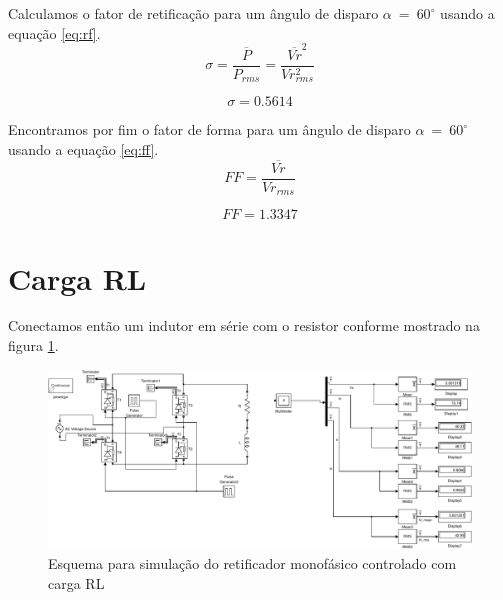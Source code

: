 \documentclass{report}
\begin{document}
Calculamos o fator de retificação para um ângulo de disparo $\alpha\ =\ 60^\circ$ usando a equação \ref{eq:rf}.
\begin{equation}
	\sigma = \frac{\overline{P}}{P_{rms}} = \frac{\overline{Vr}^2}{Vr_{rms}^2}
	\label{eq:rf}
\end{equation}

\begin{equation}
	\sigma = 0.5614
\end{equation}

Encontramos por fim o fator de forma para um ângulo de disparo $\alpha\ =\ 60^\circ$ usando a equação \ref{eq:ff}.
\begin{equation}
FF = \frac{\overline{Vr}}{Vr_{rms}}
\label{eq:ff}
\end{equation}

\begin{equation}
FF = 1.3347
\end{equation}


\section{Carga RL}
Conectamos então um indutor em série com o resistor conforme mostrado na figura \ref{fig:rlsim}.
\begin{figure}[H]
	\centering
	\includegraphics[width=\linewidth]{matlab/rlsim}
	\caption{Esquema para simulação do retificador monofásico controlado com carga RL}
	\label{fig:rlsim}
\end{figure}
\end{document}
